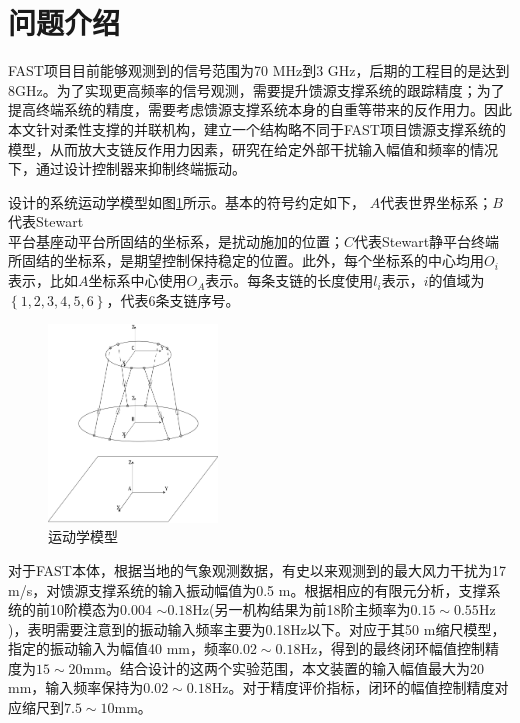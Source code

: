 \section{问题介绍}

FAST项目目前能够观测到的信号范围为70 MHz到3 GHz，后期的工程目的是达到8GHz。为了实现更高频率的信号观测，需要提升馈源支撑系统的跟踪精度；为了提高终端系统的精度，需要考虑馈源支撑系统本身的自重等带来的反作用力。因此本文针对柔性支撑的并联机构，建立一个结构略不同于FAST项目馈源支撑系统的模型，从而放大支链反作用力因素，研究在给定外部干扰输入幅值和频率的情况下，通过设计控制器来抑制终端振动。

设计的系统运动学模型如图\ref{fig:kinetic_model}所示。基本的符号约定如下，
$A$代表世界坐标系；$B$代表Stewart\\
平台基座动平台所固结的坐标系，是扰动施加的位置；$C$代表Stewart静平台终端所固结的坐标系，是期望控制保持稳定的位置。此外，每个坐标系的中心均用$O_i$表示，比如$A$坐标系中心使用$O_A$表示。每条支链的长度使用$l_i$表示，$i$的值域为$\left\{ 1,2,3,4,5,6 \right\}$，代表6条支链序号。

\begin{figure}[H]
    \centering
    \includegraphics[width=0.4\textwidth]{./imgs/model_structure.png}
    \caption{运动学模型}
    \label{fig:kinetic_model}
\end{figure}

对于FAST本体，根据当地的气象观测数据，有史以来观测到的最大风力干扰为17 m/s，对馈源支撑系统的输入振动幅值为0.5 m\cite{nanFiveHundredMeter2006}。根据相应的有限元分析，支撑系统的前10阶模态为$ 0.004$ $\sim 0.18 \mathrm{Hz}$(另一机构结果为前18阶主频率为$0.15\sim 0.55\mathrm{Hz}$)，表明需要注意到的振动输入频率主要为0.18Hz以下\cite{nanFiveHundredMeter2006}。对应于其50 m缩尺模型，指定的振动输入为幅值40 mm，频率$ 0.02 \sim 0.18 \mathrm{Hz}$，得到的最终闭环幅值控制精度为$ 15\sim 20 \mathrm{mm}$\cite{duanRouXingZhiChengStewartPingTaiDeFenXiYouHuaYuKongZhiYanJiu2008}。结合设计的这两个实验范围，本文装置的输入幅值最大为20 mm，输入频率保持为$ 0.02\sim 0.18 \mathrm{Hz}$。对于精度评价指标，闭环的幅值控制精度对应缩尺到$ 7.5\sim 10 \mathrm{mm}$。


\FloatBarrier
